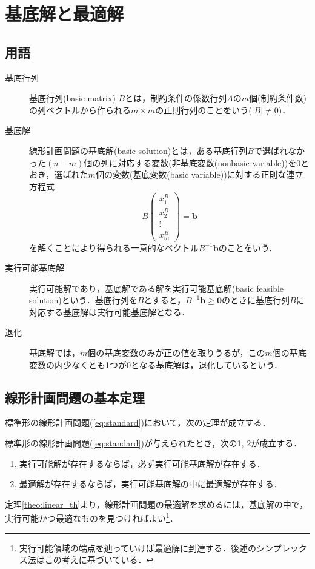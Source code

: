 \documentclass{jsreport}
\begin{document}
\section{基底解と最適解}
\subsection{用語}
\begin{description}
  \item[基底行列]
  基底行列(basic matrix) $B$とは，制約条件の係数行列$A$の$m$個(制約条件数)の列ベクトルから作られる$m \times m$の正則行列のことをいう($|B| \neq 0$)．
  \item[基底解]
  線形計画問題の基底解(basic solution)とは，ある基底行列$B$で選ばれなかった$(n - m)$個の列に対応する変数(非基底変数(nonbasic variable))を0とおき，選ばれた$m$個の変数(基底変数(basic variable))に対する正則な連立方程式
  \begin{equation}\label{eq:basic}
    B \left(
    \begin{array}{c}
      x_1^{B} \\
      x_2^{B} \\
      \vdots \\
      x_m^{B}
    \end{array}
    \right) = \bm{b}
  \end{equation}
  を解くことにより得られる一意的なベクトル$B^{-1}\bm{b}$のことをいう．
  \item[実行可能基底解]
  実行可能解であり，基底解である解を実行可能基底解(basic feasible solution)という．基底行列を$B$とすると，$B^{-1}\bm{b} \geq \bm{0}$のときに基底行列$B$に対応する基底解は実行可能基底解となる．
  \item[退化]
  基底解では，$m$個の基底変数のみが正の値を取りうるが，この$m$個の基底変数の内少なくとも1つが0となる基底解は，退化しているという．
\end{description}

\subsection{線形計画問題の基本定理}
標準形の線形計画問題(\ref{eq:standard})において，次の定理が成立する．
\begin{theo}[線形計画問題の基本定理]\label{theo:linear_th}
  標準形の線形計画問題(\ref{eq:standard})が与えられたとき，次の1, 2が成立する．
  \begin{enumerate}
    \item 実行可能解が存在するならば，必ず実行可能基底解が存在する．
    \item 最適解が存在するならば，実行可能基底解の中に最適解が存在する．
  \end{enumerate}
\end{theo}
定理\ref{theo:linear_th}より，線形計画問題の最適解を求めるには，基底解の中で，実行可能かつ最適なものを見つければよい\footnote{実行可能領域の端点を辿っていけば最適解に到達する．後述のシンプレックス法はこの考えに基づいている．}．
\end{document}
